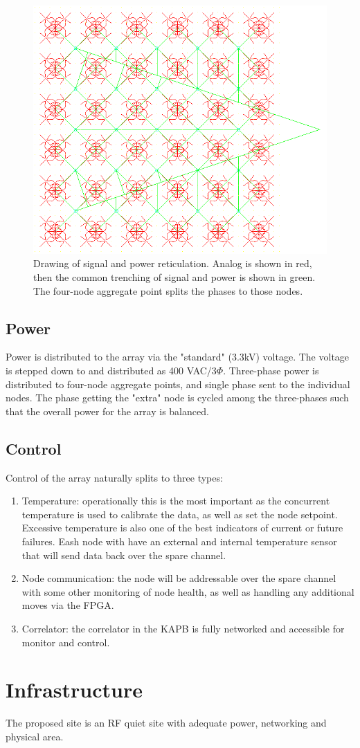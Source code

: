 \documentclass[11pt]{article}
\begin{document}
\begin{figure}[H]
\centering
\includegraphics[width=14cm]{heraconfig576ret.png}
\caption{Drawing of signal and power reticulation.  Analog is shown in red, then the common trenching of signal and power is shown in green.  The four-node aggregate point splits the phases to those nodes.}
\label{fig:heraconfig576ret}
\end{figure}

\subsection{Power}
Power is distributed to the array via the "standard" (3.3kV) voltage.   The voltage is stepped down to and distributed as 400 VAC/3$\Phi$.  Three-phase power is distributed to four-node aggregate points, and single phase sent to the individual nodes.  The phase getting the "extra" node is cycled among the three-phases such that the overall power for the array is balanced.

\subsection{Control}
Control of the array naturally splits to three types:
\begin{enumerate}
\item Temperature:  operationally this is the most important as the concurrent temperature is used to calibrate the data, as well as set the node setpoint.  Excessive temperature is also one of the best indicators of current or future failures.  Eash node with have an external and internal temperature sensor that will send data back over the spare channel.
\item Node communication:  the node will be addressable over the spare channel with some other monitoring of node health, as well as handling any additional moves via the FPGA.
\item Correlator:  the correlator in the KAPB is fully networked and accessible for monitor and control.
\end{enumerate}

\section{Infrastructure}
The proposed site is an RF quiet site with adequate power, networking and physical area.



\end{document}
